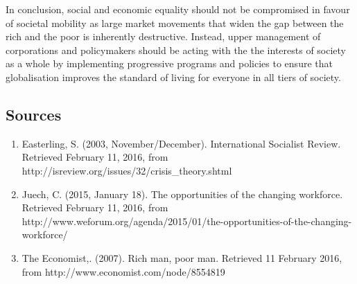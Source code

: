 \documentclass[]{article}
\begin{document}
In conclusion, social and economic equality should not be compromised in
favour of societal mobility as large market movements that widen the gap
between the rich and the poor is inherently destructive. Instead, upper
management of corporations and policymakers should be acting with the
the interests of society as a whole by implementing progressive programs
and policies to ensure that globalisation improves the standard of
living for everyone in all tiers of society.

\subsection{Sources}\label{sources}

\begin{enumerate}
\def\labelenumi{\arabic{enumi}.}
\itemsep1pt\parskip0pt
\item
  Easterling, S. (2003, November/December). International Socialist
  Review. Retrieved February 11, 2016, from
  http://isreview.org/issues/32/crisis\_theory.shtml
\item
  Juech, C. (2015, January 18). The opportunities of the changing
  workforce. Retrieved February 11, 2016, from
  http://www.weforum.org/agenda/2015/01/the-opportunities-of-the-changing-workforce/
\item
  The Economist,. (2007). Rich man, poor man. Retrieved 11 February
  2016, from http://www.economist.com/node/8554819
\end{enumerate}
\end{document}
